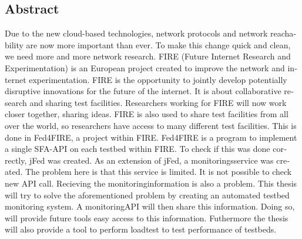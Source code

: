 \newpage
\begin{otherlanguage}{english}
\chapter*{Abstract}
\npar
Due to the new cloud-based technologies, network protocols and network reachability are now more important than ever. To make this change quick and clean, we need more and more network research. FIRE (Future Internet Research and Experimentation) is an European project created to improve the network and internet experimentation. FIRE is the opportunity to jointly develop potentially disruptive innovations for the future of the internet. It is about collaborative research and sharing test facilities. Researchers working for FIRE will now work closer together, sharing ideas. FIRE is also used to share test facilities from all over the world, so researchers have access to many different test facilities. This is done in Fed4FIRE, a project within FIRE.
\npar
Fed4FIRE is a program to implement a single SFA-API on each testbed within FIRE. To check if this was done correctly, jFed was created. 
As an extension of jFed, a monitoringsservice was created. The problem here is that this service is limited. It is not possible to check new API call. Recieving the monitoringinformation is also a problem.
\npar
This thesis will try to solve the aforementioned problem by creating an automated testbed monitoring system. A monitoringAPI will then share this information. Doing so, will provide future tools easy access to this information. Futhermore the thesis will also provide a tool to perform loadtest to test performance of testbeds.
\end{otherlanguage}